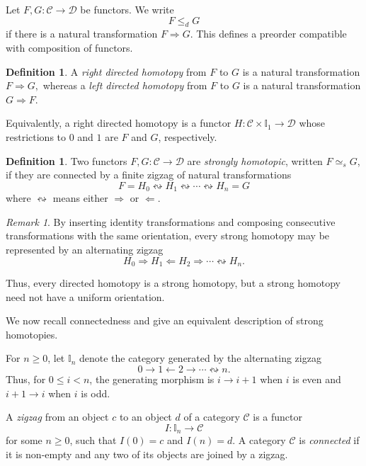 \documentclass[12pt]{amsart}
\theoremstyle{definition}
\newtheorem{definition}[teo]{Definition}
\theoremstyle{remark}
\newtheorem{remark}[teo]{Remark}
\numberwithin{figure}{section}%
\newcommand{\CC}{\mathcal{C}}
\newcommand{\Dc}{\mathcal{D}}
\begin{document}
Let \(F,G\colon\CC\to\Dc\) be functors. We write
\[
F\leq_dG
\]
if there is a natural transformation \(F\Rightarrow G\). This defines a
preorder compatible with composition of functors.

\begin{definition}\label{def:directed_homotopy}
A \emph{right directed homotopy} from \(F\) to \(G\) is a natural
transformation
\(
F\Rightarrow G,
\)
whereas a \emph{left directed homotopy} from \(F\) to \(G\) is a natural
transformation
\(
G\Rightarrow F.
\)
\end{definition}

Equivalently, a right directed homotopy is a functor
\(H\colon\CC\times\mathbb I_1\to\Dc\) whose restrictions to \(0\) and
\(1\) are \(F\) and \(G\), respectively.

\begin{definition}\label{def:strong_homotopy}
Two functors \(F,G\colon\CC\to\Dc\) are \emph{strongly homotopic},
written \(F\simeq_sG\), if they are connected by a finite zigzag of
natural transformations
\[
F=H_0
\leftrightsquigarrow
H_1
\leftrightsquigarrow
\cdots
\leftrightsquigarrow
H_n=G
\]
where \(\leftrightsquigarrow\) means either \(\Rightarrow\) or \(\Leftarrow\).
\end{definition}

\begin{remark}\label{rem:Homotopies_zig-zag}
By inserting identity transformations and composing consecutive
transformations with the same orientation, every strong homotopy may be
represented by an alternating zigzag
\[
H_0\Rightarrow H_1\Leftarrow H_2\Rightarrow\cdots
\leftrightsquigarrow H_n.
\]
\end{remark}

Thus, every directed homotopy is a strong homotopy, but a strong homotopy
need not have a uniform orientation.

We now recall connectedness and give an equivalent description of strong
homotopies.

For \(n\geq0\), let \(\mathbb I_n\) denote the category generated by the
alternating zigzag
\[
0
\longrightarrow
1
\longleftarrow
2
\longrightarrow
\cdots
\leftrightsquigarrow
n.
\]
Thus, for \(0\leq i<n\), the generating morphism is
\(i\to i+1\) when \(i\) is even and \(i+1\to i\) when \(i\) is odd.

A \emph{zigzag} from an object \(c\) to an object \(d\) of a category
\(\CC\) is a functor
\[
I\colon\mathbb I_n\longrightarrow\CC
\]
for some \(n\geq0\), such that \(I(0)=c\) and \(I(n)=d\). A category
\(\CC\) is \emph{connected} if it is non-empty and any two of its objects
are joined by a zigzag.
\end{document}
